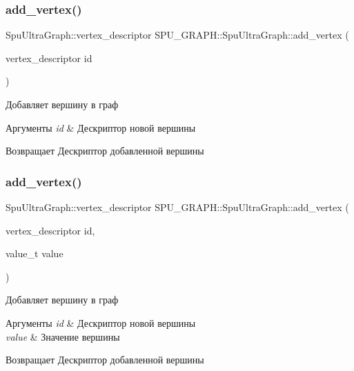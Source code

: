 \subsubsection{\texorpdfstring{add\+\_\+vertex()}{add\_vertex()}\hspace{0.1cm}{\footnotesize\ttfamily [3/4]}}
{\footnotesize\ttfamily Spu\+Ultra\+Graph\+::vertex\+\_\+descriptor S\+P\+U\+\_\+\+G\+R\+A\+P\+H\+::\+Spu\+Ultra\+Graph\+::add\+\_\+vertex (\begin{DoxyParamCaption}\item[{vertex\+\_\+descriptor}]{id }\end{DoxyParamCaption})}

Добавляет вершину в граф 
\begin{DoxyParams}{Аргументы}
{\em id} & Дескриптор новой вершины \\
\hline
\end{DoxyParams}
\begin{DoxyReturn}{Возвращает}
Дескриптор добавленной вершины 
\end{DoxyReturn}
\mbox{\label{class_s_p_u___g_r_a_p_h_1_1_spu_ultra_graph_a66c63dc4bf4c8a47abd2974f4e16a83c}} 
\subsubsection{\texorpdfstring{add\+\_\+vertex()}{add\_vertex()}\hspace{0.1cm}{\footnotesize\ttfamily [4/4]}}
{\footnotesize\ttfamily Spu\+Ultra\+Graph\+::vertex\+\_\+descriptor S\+P\+U\+\_\+\+G\+R\+A\+P\+H\+::\+Spu\+Ultra\+Graph\+::add\+\_\+vertex (\begin{DoxyParamCaption}\item[{vertex\+\_\+descriptor}]{id,  }\item[{value\+\_\+t}]{value }\end{DoxyParamCaption})}

Добавляет вершину в граф 
\begin{DoxyParams}{Аргументы}
{\em id} & Дескриптор новой вершины \\
\hline
{\em value} & Значение вершины \\
\hline
\end{DoxyParams}
\begin{DoxyReturn}{Возвращает}
Дескриптор добавленной вершины 
\end{DoxyReturn}
\mbox{\label{class_s_p_u___g_r_a_p_h_1_1_spu_ultra_graph_adf0f5b7b79b93ef295c39a615b51c71a}} 
